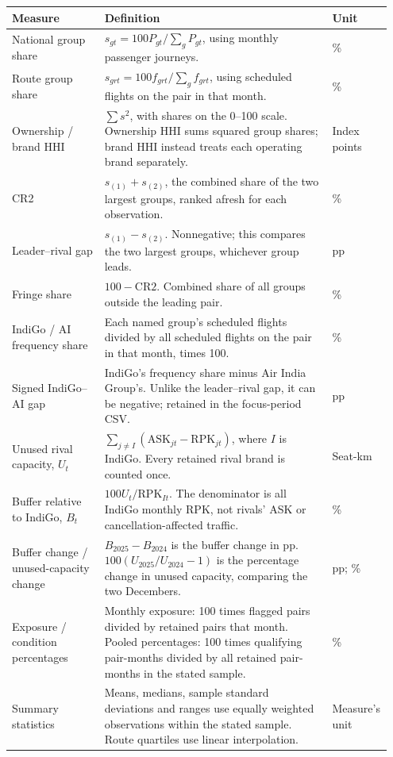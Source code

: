 \begin{tabular}{@{}>{\raggedright\arraybackslash}p{0.24\linewidth}>{\raggedright\arraybackslash}p{0.59\linewidth}>{\raggedright\arraybackslash}p{0.12\linewidth}@{}}
\toprule
Measure & Definition & Unit \\
\midrule
National group share & $s_{gt}=100P_{gt}/\sum_gP_{gt}$, using monthly passenger journeys. & \% \\
\addlinespace[5pt]
Route group share & $s_{grt}=100f_{grt}/\sum_gf_{grt}$, using scheduled flights on the pair in that month. & \% \\
\addlinespace[5pt]
Ownership / brand HHI & $\sum s^2$, with shares on the 0--100 scale. Ownership HHI sums squared group shares; brand HHI instead treats each operating brand separately. & Index points \\
\addlinespace[5pt]
CR2 & $s_{(1)}+s_{(2)}$, the combined share of the two largest groups, ranked afresh for each observation. & \% \\
\addlinespace[5pt]
Leader--rival gap & $s_{(1)}-s_{(2)}$. Nonnegative; this compares the two largest groups, whichever group leads. & pp \\
\addlinespace[5pt]
Fringe share & $100-\mathrm{CR2}$. Combined share of all groups outside the leading pair. & \% \\
\addlinespace[5pt]
IndiGo / AI frequency share & Each named group's scheduled flights divided by all scheduled flights on the pair in that month, times 100. & \% \\
\addlinespace[5pt]
Signed IndiGo--AI gap & IndiGo's frequency share minus Air India Group's. Unlike the leader--rival gap, it can be negative; retained in the focus-period CSV. & pp \\
\addlinespace[5pt]
Unused rival capacity, $U_t$ & $\sum_{j\ne I}(\mathrm{ASK}_{jt}-\mathrm{RPK}_{jt})$, where $I$ is IndiGo. Every retained rival brand is counted once. & Seat-km \\
\addlinespace[5pt]
Buffer relative to IndiGo, $B_t$ & $100U_t/\mathrm{RPK}_{It}$. The denominator is all IndiGo monthly RPK, not rivals' ASK or cancellation-affected traffic. & \% \\
\addlinespace[5pt]
Buffer change / unused-capacity change & $B_{2025}-B_{2024}$ is the buffer change in pp. $100(U_{2025}/U_{2024}-1)$ is the percentage change in unused capacity, comparing the two Decembers. & pp; \% \\
\addlinespace[5pt]
Exposure / condition percentages & Monthly exposure: 100 times flagged pairs divided by retained pairs that month. Pooled percentages: 100 times qualifying pair-months divided by all retained pair-months in the stated sample. & \% \\
\addlinespace[5pt]
Summary statistics & Means, medians, sample standard deviations and ranges use equally weighted observations within the stated sample. Route quartiles use linear interpolation. & Measure's unit \\
\bottomrule
\end{tabular}
